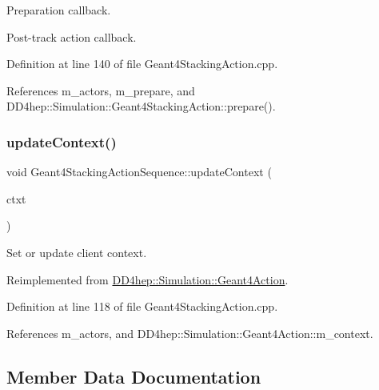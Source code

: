 Preparation callback. 

Post-\/track action callback. 

Definition at line 140 of file Geant4\+Stacking\+Action.\+cpp.



References m\+\_\+actors, m\+\_\+prepare, and D\+D4hep\+::\+Simulation\+::\+Geant4\+Stacking\+Action\+::prepare().

\hypertarget{class_d_d4hep_1_1_simulation_1_1_geant4_stacking_action_sequence_a093447274a6d135bc1d69fe96ed0961c}{}\label{class_d_d4hep_1_1_simulation_1_1_geant4_stacking_action_sequence_a093447274a6d135bc1d69fe96ed0961c} 
\subsubsection{\texorpdfstring{update\+Context()}{updateContext()}}
{\footnotesize\ttfamily void Geant4\+Stacking\+Action\+Sequence\+::update\+Context (\begin{DoxyParamCaption}\item[{\hyperlink{class_d_d4hep_1_1_simulation_1_1_geant4_context}{Geant4\+Context} $\ast$}]{ctxt }\end{DoxyParamCaption})\hspace{0.3cm}{\ttfamily [virtual]}}



Set or update client context. 



Reimplemented from \hyperlink{class_d_d4hep_1_1_simulation_1_1_geant4_action_ae3b9daf2af881df956c46568c0743313}{D\+D4hep\+::\+Simulation\+::\+Geant4\+Action}.



Definition at line 118 of file Geant4\+Stacking\+Action.\+cpp.



References m\+\_\+actors, and D\+D4hep\+::\+Simulation\+::\+Geant4\+Action\+::m\+\_\+context.



\subsection{Member Data Documentation}
\hypertarget{class_d_d4hep_1_1_simulation_1_1_geant4_stacking_action_sequence_af1288d59daee21aca2f409b9dc629a04}{}\label{class_d_d4hep_1_1_simulation_1_1_geant4_stacking_action_sequence_af1288d59daee21aca2f409b9dc629a04} 
